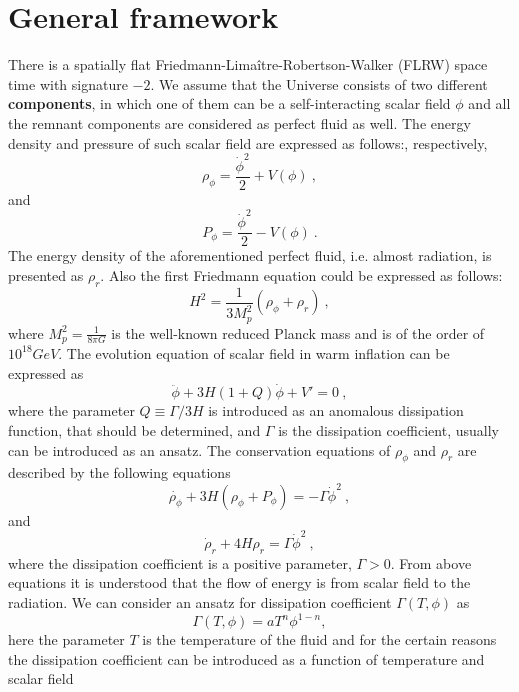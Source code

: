 \documentclass[12pt]{revtex4}
\begin{document}
\section{General framework}\label{warmrew}
There is a spatially flat Friedmann-Lima\^{i}tre-Robertson-Walker (FLRW) space time with signature $-2$. We assume that the Universe consists of two different {\bf components},  in which one of them can be a self-interacting scalar field  $\phi$ and {all the remnant } components  are considered as perfect fluid as well. The energy density and pressure of such scalar field are expressed  as follows:, respectively,
$$\rho_{\phi}=\frac{\dot{\phi}^2}{2}+V(\phi)~,$$
 and
$$P_{\phi}=\frac{\dot{\phi}^2}{2}-V(\phi)~.$$
The energy density of the aforementioned perfect fluid, i.e. almost radiation, is presented as $\rho_r$.
Also the first Friedmann equation could be expressed as follows:
\begin{equation}
H^2=\frac{1}{3M_{p}^{2}}(\rho_{\phi}+\rho_r)~,\label{Freq}
\end{equation}
where $M_{p}^{2}=\frac{1}{8\pi G}$ is the well-known reduced Planck mass and is {of the} order of $10^{18} GeV$.
The evolution equation of scalar field in warm inflation{ can be } expressed as \cite{warm0,warm1,warm2,Berera2,sayar}
\begin{equation}\label{ddotphi}
\ddot \phi  + 3H(1 + Q)\dot \phi  + V' = 0~,
\end{equation}
where the parameter $Q\equiv \Gamma/3H$ is introduced as an anomalous dissipation function,{ that} should be determined,  and $\Gamma$ is
 the  dissipation coefficient, usually can be {introduced} as an ansatz.
The conservation equations of $\rho_{\phi}$ and $\rho_{r}$ are described by the following equations \cite{warm,Berera2}
\begin{equation}\label{rhodotphi}
\dot{\rho_{\phi}}+3 H(\rho_{\phi}+P_{\phi})=-\Gamma \dot{\phi}^{2}~,
\end{equation}
and
\begin{equation}\label{rhodotr}
\dot{\rho}_{r}+4H\rho_{r}=\Gamma \dot{\phi}^{2}~, %
\end{equation}
where the  dissipation coefficient {is a positive parameter}, $\Gamma>0$. From above equations it is understood that the flow of energy is from scalar field to the radiation. We can consider an ansatz for  dissipation coefficient $\Gamma(T,\phi)$ as
\begin{equation}
\Gamma(T,\phi)=aT^n\phi^{1-n}, \label{Gamma}
\end{equation}
here {the  parameter $T$} is the  temperature of the fluid and for the certain reasons the dissipation coefficient can be introduced as a function of temperature and scalar field
\end{document}
